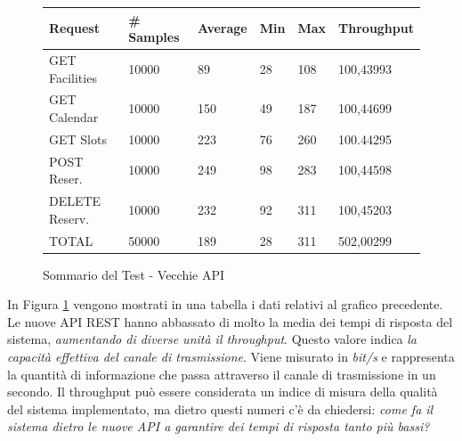 \begin{figure}[H]
    \begin{table}[H]
        \centering
        \begin{tabular}{ |p{3cm}||p{2cm}|p{2cm}|p{1cm}|p{1cm}|p{2cm}| }
            \hline
            Request & \# Samples & Average  & Min & Max &  Throughput\\
            \hline
            GET Facilities      & 10000    & 89   & 28 & 108 & 100,43993      \\
            GET Calendar        & 10000    & 150   & 49 & 187        & 100,44699      \\
            GET Slots        & 10000    & 223   & 76 & 260        & 100.44295      \\
            POST Reser.        & 10000    & 249    & 98 & 283        & 100,44598      \\
            DELETE Reserv.        & 10000    & 232    & 92 & 311        & 100,45203      \\
            TOTAL        & 50000    & 189    & 28 & 311        & 502,00299      \\
            \hline
        \end{tabular}
    \end{table}
    \caption{Sommario del Test - Vecchie API}
    \label{fig:newapi100t_summary}
\end{figure}
In Figura \ref{fig:newapi100t_summary} vengono mostrati in una tabella i dati relativi al grafico precedente. Le nuove API REST hanno abbassato di molto la media dei tempi di risposta del sistema, \emph{aumentando di diverse unità il throughput}. Questo valore indica \emph{la capacità effettiva del canale di trasmissione}. Viene misurato in \emph{bit/s} e rappresenta la quantità di informazione che passa attraverso il canale di trasmissione in un secondo. Il throughput può essere considerata un indice di misura della qualità del sistema implementato, ma dietro questi numeri c'è da chiedersi: \emph{come fa il sistema dietro le nuove API a garantire dei tempi di risposta tanto più bassi?}

